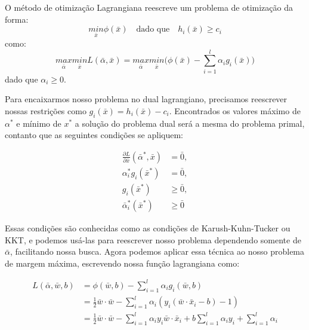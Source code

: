 O método de otimização Lagrangiana reescreve um problema de otimização da forma:
\begin{equation}
\underset{\bar{x}}{min}\phi(\bar{x}) \quad \text{dado que} \quad h_i(\bar{x})\ge c_i
\end{equation}
como:
\begin{equation}
\underset{\bar{\alpha}}{max} \underset{\bar{x}}{min} L(\bar{\alpha},\bar{x}) = \underset{\bar{\alpha}}{max} \underset{\bar{x}}{min}\bigg(\phi(\bar{x})-\sum_{i=1}^{l}\alpha_i g_i(\bar{x})\bigg)
    \label{eq:LABEL_EQ_7}
\end{equation}
dado que $\alpha_i\ge0$.

Para encaixarmos nosso problema no dual lagrangiano, precisamos reescrever nossas restrições como $g_i(\bar{x})=h_i(\bar{x})-c_i$. Encontrados os valores máximo de $\alpha^*$ e mínimo de $x^*$ a solução do problema dual será a mesma do problema primal, contanto que as seguintes condições se apliquem:

\begin{equation}
\begin{split}
\frac{\partial L}{\partial \bar{x}}(\bar{\alpha}^*,\bar{x})&=\bar{0}, \\
\alpha_i^*g_i(\bar{x}^*)&=\bar{0}, \\
g_i(\bar{x}^*)&\ge\bar{0} , \\
\bar{\alpha}_i^*(\bar{x}^*)&\ge\bar{0} 
\end{split}
\end{equation}

Essas condições são conhecidas como as condições de Karush-Kuhn-Tucker ou KKT, e podemos usá-las para reescrever nosso problema dependendo somente de $\bar{\alpha}$, facilitando nossa busca. Agora podemos aplicar essa técnica ao nosso problema de margem máxima, escrevendo nossa função lagrangiana como:

\begin{equation}
\begin{split}
L(\bar{\alpha},\bar{w},b) &=\phi(\bar{w},b) -  \sum_{i=1}^{l}\alpha_i g_i (\bar{w},b) \\
 &=\frac{1}{2}\bar{w}\cdot\bar{w} - \sum_{i=1}^{l}\alpha_i (y_i(\bar{w}\cdot \bar{x}_i -b)-1) \\
 &=\frac{1}{2}\bar{w}\cdot\bar{w} - \sum_{i=1}^{l}\alpha_i y_i \bar{w}\cdot \bar{x}_i + b \sum_{i=1}^{l}\alpha_i y_i + \sum_{i=1}^{l}\alpha_i\\
\end{split}
\end{equation}

